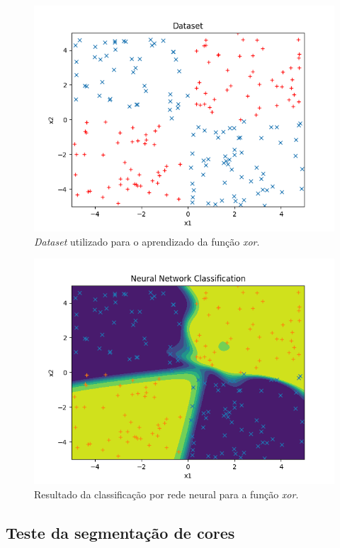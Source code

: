 \documentclass[conference]{IEEEtran}
\begin{document}
\begin{figure}[htbp]
\centering
\centerline{\includegraphics[scale=0.5]{imagens/xor/dataset.png}}
\caption{\textit{Dataset} utilizado para o aprendizado da função \textit{xor}.}
\label{xor/dataset}
\end{figure}

\begin{figure}[htbp]
\centering
\centerline{\includegraphics[scale=0.5]{imagens/xor/neural_net_classification.png}}
\caption{Resultado da classificação por rede neural para a função \textit{xor}.}
\label{xor/neural_net_classification}
\end{figure} 

\subsection{Teste da segmentação de cores}
\end{document}

